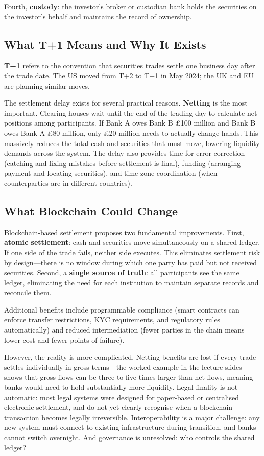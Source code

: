 \documentclass[11pt,a4paper]{article}
\newcommand{\keyword}[1]{\textbf{\textcolor{AccentOrange}{#1}}}
\begin{document}
Fourth, \keyword{custody}: the investor's broker or custodian bank holds the securities on the investor's behalf and maintains the record of ownership.

\subsection{What T+1 Means and Why It Exists}

\keyword{T+1} refers to the convention that securities trades settle one business day after the trade date. The US moved from T+2 to T+1 in May 2024; the UK and EU are planning similar moves.

The settlement delay exists for several practical reasons. \keyword{Netting} is the most important. Clearing houses wait until the end of the trading day to calculate net positions among participants. If Bank A owes Bank B \pounds 100 million and Bank B owes Bank A \pounds 80 million, only \pounds 20 million needs to actually change hands. This massively reduces the total cash and securities that must move, lowering liquidity demands across the system. The delay also provides time for error correction (catching and fixing mistakes before settlement is final), funding (arranging payment and locating securities), and time zone coordination (when counterparties are in different countries).

\subsection{What Blockchain Could Change}

Blockchain-based settlement proposes two fundamental improvements. First, \keyword{atomic settlement}: cash and securities move simultaneously on a shared ledger. If one side of the trade fails, neither side executes. This eliminates settlement risk by design---there is no window during which one party has paid but not received securities. Second, a \keyword{single source of truth}: all participants see the same ledger, eliminating the need for each institution to maintain separate records and reconcile them.

Additional benefits include programmable compliance (smart contracts can enforce transfer restrictions, KYC requirements, and regulatory rules automatically) and reduced intermediation (fewer parties in the chain means lower cost and fewer points of failure).

However, the reality is more complicated. Netting benefits are lost if every trade settles individually in gross terms---the worked example in the lecture slides shows that gross flows can be three to five times larger than net flows, meaning banks would need to hold substantially more liquidity. Legal finality is not automatic: most legal systems were designed for paper-based or centralised electronic settlement, and do not yet clearly recognise when a blockchain transaction becomes legally irreversible. Interoperability is a major challenge: any new system must connect to existing infrastructure during transition, and banks cannot switch overnight. And governance is unresolved: who controls the shared ledger?
\end{document}
